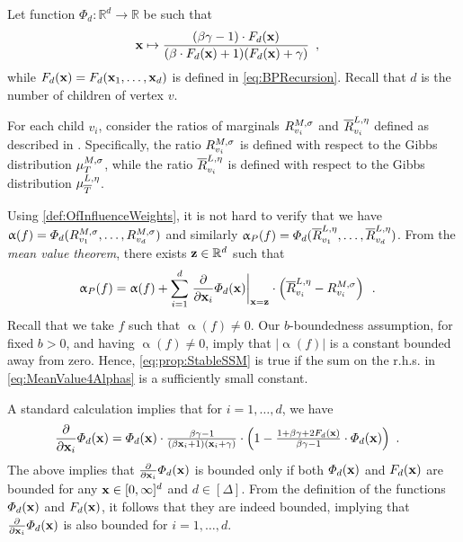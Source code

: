 \documentclass[11pt,reqno]{amsart}
\numberwithin{equation}{section}
\newcommand{\blue}[1]{{\color{blue}#1}}
\newcommand{\capri}[1]{{\color{capri}#1}}
\newcommand{\cadmiumgreen}[1]{{\color{cadmiumgreen}#1}}
\newcommand{\cadmiumorange}[1]{{\color{cadmiumorange}#1}}
\newcommand{\deeppink}[1]{{\color{deeppink}#1}}
\newcommand{\electricviolet}[1]{{\color{electricviolet}#1}}
\newcommand{\goldenbrown}[1]{{\color{goldenbrown}#1}}
\newcommand{\heliotrope}[1]{{\color{heliotrope}#1}}
\newcommand{\maxDeg}{{\Delta}}
\newcommand{\abs}[1]{\blue{|}#1\blue{|}}
\renewcommand{\blue}[1]{#1}
\renewcommand{\capri}[1]{#1}
\renewcommand{\cadmiumgreen}[1]{#1}
\renewcommand{\cadmiumorange}[1]{#1}
\renewcommand{\deeppink}[1]{#1}
\renewcommand{\electricviolet}[1]{#1}
\renewcommand{\goldenbrown}[1]{#1}
\renewcommand{\heliotrope}[1]{#1}
\newcommand{\kf}{\deeppink{f}}
\newcommand{\ki}{\capri{i}}
\newcommand{\kL}{\cadmiumorange{L}}
\newcommand{\kP}{\goldenbrown{P}}
\newcommand{\kv}{\electricviolet{v}}
\newcommand{\kx}{\heliotrope{x}}
\newcommand{\kz}{\cadmiumgreen{z}}
\renewcommand{\kf}{f}
\renewcommand{\ki}{i}
\renewcommand{\kL}{L}
\renewcommand{\kP}{P}
\renewcommand{\kv}{v}
\renewcommand{\kx}{x}
\renewcommand{\kz}{z}
\newcommand{\infweight}{\upalpha}
\begin{document}
Let function $\Phi_d:\mathbb{R}^d\to \mathbb{R}$ be such that 
\begin{align}\label{eq:DefOfPhiSSM}
{\bf \kx} &%
\mapsto \frac{(\beta \gamma-1) \cdot F_d({\bf \kx})} {(\beta \cdot F_d({\bf \kx})+1)(F_d({\bf \kx})+\gamma)}\enspace, 
\end{align}
while $F_d({\bf \kx})=F_d({\bf \kx}_1, \ldots, {\bf \kx}_d)$ is defined in \eqref{eq:BPRecursion}. 
Recall that $d$ is the number of children of vertex $\kv$.




For each child $\kv_{\ki}$,  consider the ratios of marginals $\ratioT^{M, \sigma}_{\kv_{\ki}}$ and 
$\ratioTP^{L, \eta}_{\kv_{\ki}}$ defined as described in . 
Specifically, the ratio $\ratioT^{M, \sigma}_{\kv_{\ki}}$ is defined with respect to the Gibbs distribution
$\mu^{M,\sigma}_{T}$, while the ratio $\ratioTP^{L, \eta}_{\kv_{\ki}}$ is defined with respect to the 
Gibbs distribution $\mu^{\kL,\eta}_{\SMTPu}$. 




Using \eqref{def:OfInfluenceWeights}, it is not hard to verify that we have 
$\infweight(\kf)=\Phi_d(\ratioT^{M, \sigma}_{\kv_1}, \ldots, \ratioT^{M, \sigma}_{\kv_d})$
and similarly $\infweight_{\kP}(\kf)=\Phi_d(\ratioTP^{\kL,\eta}_{\kv_1},\ldots, \ratioTP^{\kL, \eta}_{\kv_d})$.
From the {\em mean value theorem}, there exists ${\bf \kz}\in \mathbb{R}^d$ such that 
\begin{align}\label{eq:MeanValue4Alphas}
\infweight_{\kP}(\kf)&=\infweight(\kf) +
\sum^{d}_{\ki=1} \left . \frac{\partial }{\partial {\bf \kx}_{\ki}}\Phi_d({\bf \kx}) \right |_{{\bf \kx}={\bf \kz}} \cdot 
\left (\ratioTP^{\kL, \eta}_{\kv_{\ki}}-\ratioT^{M, \sigma}_{\kv_{\ki}} \right )\enspace.
\end{align}
Recall that we take $\kf$ such that $\infweight(\kf) \neq 0$.  Our  $b$-boundedness assumption, for fixed 
$b>0$, and having  $ \infweight(\kf) \neq 0$, imply that $\abs{\infweight (\kf)}$ is a constant  bounded away 
from zero. Hence, \eqref{eq:prop:StableSSM} is true if the sum on the r.h.s. in \eqref{eq:MeanValue4Alphas} 
is a  sufficiently small constant. 


A standard calculation implies that for $\ki =1,\ldots, d$, we have 
\begin{align}
\frac{\partial }{\partial {\bf \kx}_{\ki}}\Phi_d({\bf \kx}) &= \Phi_d({\bf \kx}) \cdot {\textstyle \frac{\beta\gamma-1}{(\beta {\bf \kx}_{\ki}+1)({\bf \kx}_{\ki}+\gamma)}}
\cdot {\textstyle \left(1-\frac{1+\beta\gamma+2F_d({\bf \kx})}{\beta\gamma-1} \cdot \Phi_d({\bf \kx}) \right) }\enspace. 
\end{align}
%
The above implies that $\frac{\partial }{\partial {\bf \kx}_{\ki}}\Phi_d({\bf \kx}) $ is bounded only
if  both $\Phi_d({\bf \kx})$ and $F_d({\bf \kx})$ are bounded for any ${\bf \kx}\in [0,\infty]^d$ and 
$d\in [\maxDeg]$.
From the definition of the functions $\Phi_d({\bf \kx})$ and $F_d({\bf \kx})$, it follows that they are indeed  bounded,  implying that 
$\frac{\partial }{\partial {\bf \kx}_{\ki}}\Phi_d({\bf \kx}) $ is also bounded  for $\ki =1,\ldots, d$. 
\end{document}

